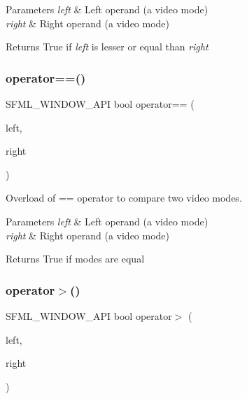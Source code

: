 \begin{DoxyParams}{Parameters}
{\em left} & Left operand (a video mode) \\
\hline
{\em right} & Right operand (a video mode)\\
\hline
\end{DoxyParams}
\begin{DoxyReturn}{Returns}
True if {\itshape left} is lesser or equal than {\itshape right} 
\end{DoxyReturn}
\mbox{\label{classsf_1_1_video_mode_a03c51c119811ffd4403c6e2bcbd4ceaf}} 
\subsubsection{\texorpdfstring{operator==()}{operator==()}}
{\footnotesize\ttfamily S\+F\+M\+L\+\_\+\+W\+I\+N\+D\+O\+W\+\_\+\+A\+PI bool operator== (\begin{DoxyParamCaption}\item[{const \hyperlink{classsf_1_1_video_mode}{Video\+Mode} \&}]{left,  }\item[{const \hyperlink{classsf_1_1_video_mode}{Video\+Mode} \&}]{right }\end{DoxyParamCaption})\hspace{0.3cm}{\ttfamily [related]}}



Overload of == operator to compare two video modes. 


\begin{DoxyParams}{Parameters}
{\em left} & Left operand (a video mode) \\
\hline
{\em right} & Right operand (a video mode)\\
\hline
\end{DoxyParams}
\begin{DoxyReturn}{Returns}
True if modes are equal 
\end{DoxyReturn}
\mbox{\label{classsf_1_1_video_mode_ab6e5b2c65a428a4b56de8551b3706a36}} 
\subsubsection{\texorpdfstring{operator$>$()}{operator>()}}
{\footnotesize\ttfamily S\+F\+M\+L\+\_\+\+W\+I\+N\+D\+O\+W\+\_\+\+A\+PI bool operator$>$ (\begin{DoxyParamCaption}\item[{const \hyperlink{classsf_1_1_video_mode}{Video\+Mode} \&}]{left,  }\item[{const \hyperlink{classsf_1_1_video_mode}{Video\+Mode} \&}]{right }\end{DoxyParamCaption})\hspace{0.3cm}{\ttfamily [related]}}



